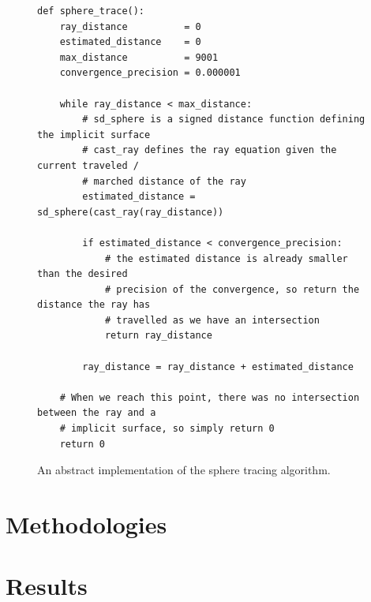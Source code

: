 \documentclass[%
    a4paper,
    nobib,   %
    openany  %
]{tufte-book}
\begin{document}
 \begin{figure}
   \caption{An abstract implementation of the sphere tracing algorithm\protect\footnotemark.}
   \begin{verbatim}
def sphere_trace():
    ray_distance          = 0
    estimated_distance    = 0
    max_distance          = 9001
    convergence_precision = 0.000001

    while ray_distance < max_distance:
        # sd_sphere is a signed distance function defining the implicit surface
        # cast_ray defines the ray equation given the current traveled /
        # marched distance of the ray
        estimated_distance = sd_sphere(cast_ray(ray_distance))

        if estimated_distance < convergence_precision:
            # the estimated distance is already smaller than the desired
            # precision of the convergence, so return the distance the ray has
            # travelled as we have an intersection
            return ray_distance

        ray_distance = ray_distance + estimated_distance

    # When we reach this point, there was no intersection between the ray and a
    # implicit surface, so simply return 0
    return 0
   \end{verbatim}
\end{figure}

\chapter{Methodologies}
\label{chap:methodologies}



\chapter{Results}
\label{chap:results}
\end{document}
